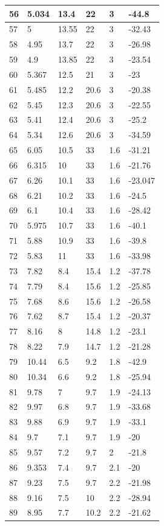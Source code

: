 \documentclass[a4paper,12pt]{report}
\begin{document}
\begin{longtable}{|l|l|l|l|l|l|}
56 & 5.034 & 13.4 & 22 & 3 & -44.8 \\ \hline
57 & 5 & 13.55 & 22 & 3 & -32.43 \\ \hline
58 & 4.95 & 13.7 & 22 & 3 & -26.98 \\ \hline
59 & 4.9 & 13.85 & 22 & 3 & -23.54 \\ \hline
60 & 5.367 & 12.5 & 21 & 3 & -23 \\ \hline
61 & 5.485 & 12.2 & 20.6 & 3 & -20.38 \\ \hline
62 & 5.45 & 12.3 & 20.6 & 3 & -22.55 \\ \hline
63 & 5.41 & 12.4 & 20.6 & 3 & -25.2 \\ \hline
64 & 5.34 & 12.6 & 20.6 & 3 & -34.59 \\ \hline
65 & 6.05 & 10.5 & 33 & 1.6 & -31.21 \\ \hline
66 & 6.315 & 10 & 33 & 1.6 & -21.76 \\ \hline
67 & 6.26 & 10.1 & 33 & 1.6 & -23.047 \\ \hline
68 & 6.21 & 10.2 & 33 & 1.6 & -24.5 \\ \hline
69 & 6.1 & 10.4 & 33 & 1.6 & -28.42 \\ \hline
70 & 5.975 & 10.7 & 33 & 1.6 & -40.1 \\ \hline
71 & 5.88 & 10.9 & 33 & 1.6 & -39.8 \\ \hline
72 & 5.83 & 11 & 33 & 1.6 & -33.98 \\ \hline
73 & 7.82 & 8.4 & 15.4 & 1.2 & -37.78 \\ \hline
74 & 7.79 & 8.4 & 15.6 & 1.2 & -25.85 \\ \hline
75 & 7.68 & 8.6 & 15.6 & 1.2 & -26.58 \\ \hline
76 & 7.62 & 8.7 & 15.4 & 1.2 & -20.37 \\ \hline
77 & 8.16 & 8 & 14.8 & 1.2 & -23.1 \\ \hline
78 & 8.22 & 7.9 & 14.7 & 1.2 & -21.28 \\ \hline
79 & 10.44 & 6.5 & 9.2 & 1.8 & -42.9 \\ \hline
80 & 10.34 & 6.6 & 9.2 & 1.8 & -25.94 \\ \hline
81 & 9.78 & 7 & 9.7 & 1.9 & -24.13 \\ \hline
82 & 9.97 & 6.8 & 9.7 & 1.9 & -33.68 \\ \hline
83 & 9.88 & 6.9 & 9.7 & 1.9 & -33.1 \\ \hline
84 & 9.7 & 7.1 & 9.7 & 1.9 & -20 \\ \hline
85 & 9.57 & 7.2 & 9.7 & 2 & -21.8 \\ \hline
86 & 9.353 & 7.4 & 9.7 & 2.1 & -20 \\ \hline
87 & 9.23 & 7.5 & 9.7 & 2.2 & -21.98 \\ \hline
88 & 9.16 & 7.5 & 10 & 2.2 & -28.94 \\ \hline
89 & 8.95 & 7.7 & 10.2 & 2.2 & -21.62 \\ \hline
\end{longtable}
\end{document}
